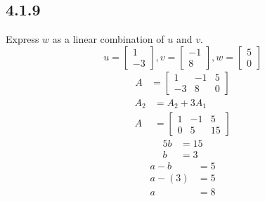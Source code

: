 \documentclass{article}
\begin{document}
\subsection{4.1.9}
Express $ w $ as a linear combination of $ u $ and $ v $.
$$
	u = \begin{bmatrix} 1 \\ -3 \end{bmatrix},
	v = \begin{bmatrix} -1 \\ 8 \end{bmatrix},
	w = \begin{bmatrix} 5 \\ 0 \end{bmatrix}
$$
\begin{align*}
	A & = \begin{bmatrix}
		1 & -1 & 5 \\
		-3 & 8 & 0
	\end{bmatrix}
\end{align*}
\begin{align*}
	A_2 & = A_2 + 3A_1 \\
	A & = \begin{bmatrix}
		1 & -1 & 5 \\
		0 & 5 & 15
	\end{bmatrix}
\end{align*}
\begin{align*}
	5b & = 15 \\
	b & = 3
\end{align*}
\begin{align*}
	a - b & = 5 \\
	a - (3) & = 5 \\
	a & = 8
\end{align*}
\end{document}
